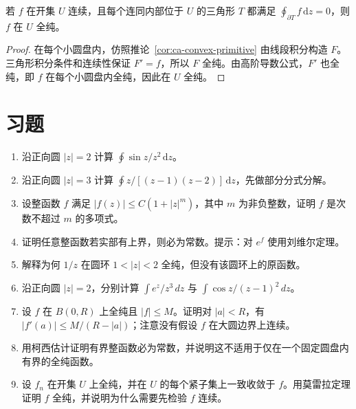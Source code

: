\begin{theorem}[莫雷拉定理]
\label{thm:ca-morera}
若 $f$ 在开集 $U$ 连续，且每个连同内部位于 $U$ 的三角形 $T$ 都满足 $\oint_{\partial T}f\,\mathrm dz=0$，则 $f$ 在 $U$ 全纯。
\end{theorem}
\begin{proof}
在每个小圆盘内，仿照推论~\ref{cor:ca-convex-primitive} 由线段积分构造 $F$。三角形积分条件和连续性保证 $F'=f$，所以 $F$ 全纯。由高阶导数公式，$F'$ 也全纯，即 $f$ 在每个小圆盘内全纯，因此在 $U$ 全纯。
\end{proof}

\section{习题}
\label{sec:ca-cauchy-ex}
\begin{enumerate}
 \item 沿正向圆 $|z|=2$ 计算 $\oint\sin z/z^2\,\mathrm dz$。
 \item 沿正向圆 $|z|=3$ 计算 $\oint z/[(z-1)(z-2)]\,\mathrm dz$，先做部分分式分解。
 \item 设整函数 $f$ 满足 $|f(z)|\le C(1+|z|^m)$，其中 $m$ 为非负整数，证明 $f$ 是次数不超过 $m$ 的多项式。
 \item 证明任意整函数若实部有上界，则必为常数。提示：对 $e^f$ 使用刘维尔定理。
 \item 解释为何 $1/z$ 在圆环 $1<|z|<2$ 全纯，但没有该圆环上的原函数。

  \item\label{ex:ca-cauchy-integrals} 沿正向圆 $|z|=2$，分别计算 $\int e^z/z^3\,dz$ 与 $\int\cos z/(z-1)^2\,dz$。
  \item\label{ex:ca-derivative-bound} 设 $f$ 在 $B(0,R)$ 上全纯且 $|f|\le M$。证明对 $|a|<R$，有 $|f'(a)|\le M/(R-|a|)$；注意没有假设 $f$ 在大圆边界上连续。
  \item\label{ex:ca-entire-bounded} 用柯西估计证明有界整函数必为常数，并说明这不适用于仅在一个固定圆盘内有界的全纯函数。
  \item\label{ex:ca-uniform-holomorphic} 设 $f_n$ 在开集 $U$ 上全纯，并在 $U$ 的每个紧子集上一致收敛于 $f$。用莫雷拉定理证明 $f$ 全纯，并说明为什么需要先检验 $f$ 连续。
\end{enumerate}

